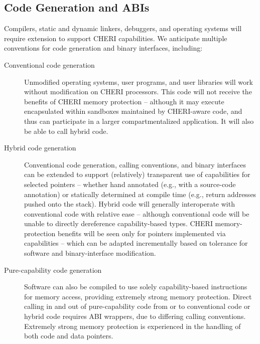 \subsection{Code Generation and ABIs}

Compilers, static and dynamic linkers, debuggers, and operating systems will
require extension to support CHERI capabilities.
We anticipate multiple conventions for code generation and binary interfaces,
including:

\begin{description}
\item[Conventional code generation] Unmodified operating systems, user
  programs, and user libraries will work without modification on CHERI
  processors.
  This code will not receive the benefits of CHERI memory protection --
  although it may execute encapsulated within sandboxes maintained by
  CHERI-aware code, and thus can participate in a larger compartmentalized
  application.
  It will also be able to call hybrid code.

\item[Hybrid code generation] Conventional code generation, calling
  conventions, and binary interfaces can be extended to support (relatively)
  transparent use of capabilities for selected pointers -- whether hand
  annotated (e.g., with a source-code annotation) or statically determined at
  compile time (e.g., return addresses pushed onto the stack).
  Hybrid code will generally interoperate with conventional code with
  relative ease -- although conventional code will be unable to directly
  dereference capability-based types.
  CHERI memory-protection benefits will be seen only for pointers implemented
  via capabilities -- which can be adapted incrementally based on tolerance
  for software and binary-interface modification.

\item[Pure-capability code generation] Software can also be compiled to use
  solely capability-based instructions for memory access, providing extremely
  strong memory protection.
  Direct calling in and out of pure-capability code from or to conventional
  code or hybrid code requires ABI wrappers, due to differing calling
  conventions.
  Extremely strong memory protection is experienced in the handling of both
  code and data pointers.


\end{description}
